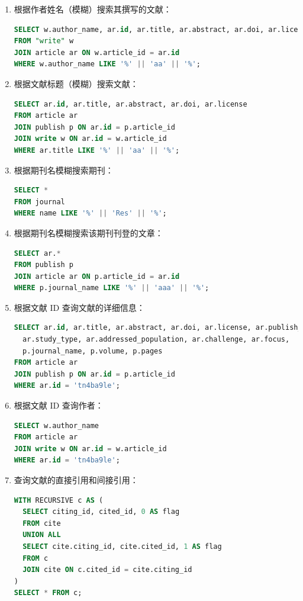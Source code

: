 \documentclass[UTF8,openany]{ctexbook}
\begin{document}
\begin{enumerate}[label=\textbf{\arabic*}]
  \item 根据作者姓名（模糊）搜索其撰写的文献：
  \begin{lstlisting}[language=sql]
SELECT w.author_name, ar.id, ar.title, ar.abstract, ar.doi, ar.license, ar.publish_time, ar.url
FROM "write" w
JOIN article ar ON w.article_id = ar.id
WHERE w.author_name LIKE '%' || 'aa' || '%';
  \end{lstlisting}

  \item 根据文献标题（模糊）搜索文献：
  \begin{lstlisting}[language=sql]
SELECT ar.id, ar.title, ar.abstract, ar.doi, ar.license
FROM article ar
JOIN publish p ON ar.id = p.article_id
JOIN write w ON ar.id = w.article_id
WHERE ar.title LIKE '%' || 'aa' || '%';
  \end{lstlisting}

  \item 根据期刊名模糊搜索期刊：
  \begin{lstlisting}[language=sql]
SELECT *
FROM journal
WHERE name LIKE '%' || 'Res' || '%';
  \end{lstlisting}

  \item 根据期刊名模糊搜索该期刊刊登的文章：
  \begin{lstlisting}[language=sql]
SELECT ar.*
FROM publish p
JOIN article ar ON p.article_id = ar.id
WHERE p.journal_name LIKE '%' || 'aaa' || '%';
  \end{lstlisting}

  \item 根据文献 ID 查询文献的详细信息：
  \begin{lstlisting}[language=sql]
SELECT ar.id, ar.title, ar.abstract, ar.doi, ar.license, ar.publish_time, ar.url,
  ar.study_type, ar.addressed_population, ar.challenge, ar.focus,
  p.journal_name, p.volume, p.pages
FROM article ar
JOIN publish p ON ar.id = p.article_id
WHERE ar.id = 'tn4ba9le';
  \end{lstlisting}

  \item 根据文献 ID 查询作者：
  \begin{lstlisting}[language=sql]
SELECT w.author_name
FROM article ar
JOIN write w ON ar.id = w.article_id
WHERE ar.id = 'tn4ba9le';
  \end{lstlisting}

  \item 查询文献的直接引用和间接引用：
  \begin{lstlisting}[language=sql]
WITH RECURSIVE c AS (
  SELECT citing_id, cited_id, 0 AS flag
  FROM cite
  UNION ALL
  SELECT cite.citing_id, cite.cited_id, 1 AS flag
  FROM c
  JOIN cite ON c.cited_id = cite.citing_id
)
SELECT * FROM c;
  \end{lstlisting}


\end{enumerate}
\end{document}
